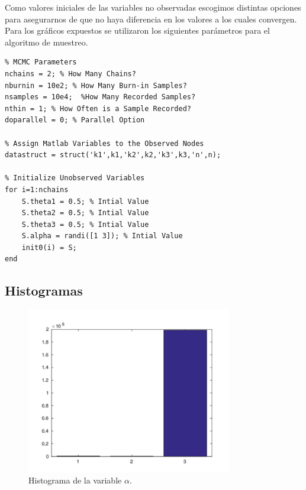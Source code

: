 Como valores iniciales de las variables no observadas escogimos distintas opciones para asegurarnos de que no haya diferencia en los valores a los cuales convergen. Para los gráficos expuestos se utilizaron los siguientes parámetros para el algoritmo de muestreo.

\begin{lstlisting}[frame=single]
% Sampling
% MCMC Parameters
nchains = 2; % How Many Chains?
nburnin = 10e2; % How Many Burn-in Samples?
nsamples = 10e4;  %How Many Recorded Samples?
nthin = 1; % How Often is a Sample Recorded?
doparallel = 0; % Parallel Option

% Assign Matlab Variables to the Observed Nodes
datastruct = struct('k1',k1,'k2',k2,'k3',k3,'n',n);

% Initialize Unobserved Variables
for i=1:nchains
    S.theta1 = 0.5; % Intial Value
    S.theta2 = 0.5; % Intial Value
    S.theta3 = 0.5; % Intial Value
    S.alpha = randi([1 3]); % Intial Value
    init0(i) = S;
end

\end{lstlisting}

\subsection{Histogramas}

\begin{figure}[H]
\begin{minipage}{1.0\textwidth}
 \centering
	\includegraphics[width=0.8\textwidth]{imgs/alpha.pdf}
	\caption{\footnotesize Histograma de la variable $\alpha$.}
\end{minipage}
\end{figure}

